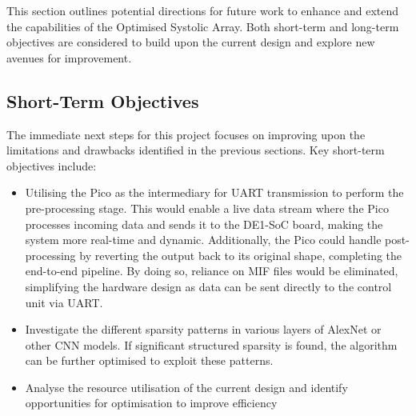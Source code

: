\documentclass[12pt, a4paper, ukenglish]{article}
\begin{document}


    This section outlines potential directions for future work to enhance and extend the capabilities of the Optimised Systolic Array. Both short-term and long-term objectives are considered to build upon the current design and explore new avenues for improvement.
    
    \subsection{Short-Term Objectives} \label{sec: short-term}
    The immediate next steps for this project focuses on improving upon the limitations and drawbacks identified in the previous sections. Key short-term objectives include:
    \begin{itemize}
        \item Utilising the Pico as the intermediary for UART transmission to perform the pre-processing stage. This would enable a live data stream where the Pico processes incoming data and sends it to the DE1-SoC board, making the system more real-time and dynamic. Additionally, the Pico could handle post-processing by reverting the output back to its original shape, completing the end-to-end pipeline. By doing so, reliance on MIF files would be eliminated, simplifying the hardware design as data can be sent directly to the control unit via UART. 
        \item Investigate the different sparsity patterns in various layers of AlexNet or other CNN models. If significant structured sparsity is found, the algorithm can be further optimised to exploit these patterns.
        \item Analyse the resource utilisation of the current design and identify opportunities for optimisation to improve efficiency
    \end{itemize}
    
\end{document}
